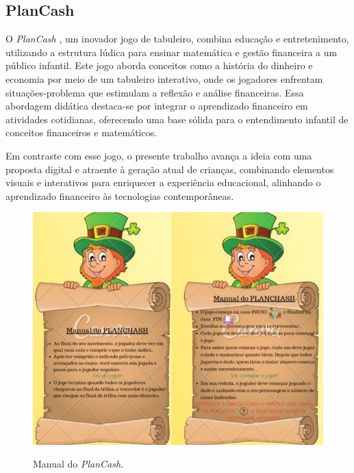 \subsection{PlanCash}
O \textit{PlanCash} \cite{mariano2020educaccao}, um inovador jogo de tabuleiro, combina educação e entretenimento, utilizando a estrutura lúdica para ensinar matemática e gestão financeira a um público infantil. Este jogo aborda conceitos como a história do dinheiro e economia por meio de um tabuleiro interativo, onde os jogadores enfrentam situações-problema que estimulam a reflexão e análise financeiras. Essa abordagem didática destaca-se por integrar o aprendizado financeiro em atividades cotidianas, oferecendo uma base sólida para o entendimento infantil de conceitos financeiros e matemáticos.

Em contraste com esse jogo, o presente trabalho avança a ideia com uma proposta digital e atraente à geração atual de crianças, combinando elementos visuais e interativos para enriquecer a experiência educacional, alinhando o aprendizado financeiro às tecnologias contemporâneas.

\begin{figure}[ht]
	\centering
	\caption{Manual do \textit{PlanCash}.}
	\includegraphics[scale=0.5]{Textuais/Pictures/Plancash-1.png}
	\label{fig:plancash-1}
\end{figure}

